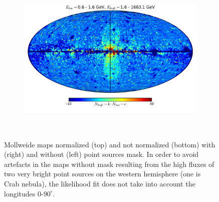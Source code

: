 \documentclass[a4paper]{article}
\begin{document}
\begin{figure}[h!]
{\begin{subfigure}[b]{.5\textwidth}
	\end{subfigure}%
	\begin{subfigure}[b]{.5\textwidth}
		\centering
		\includegraphics[width=.95\textwidth]{FitE_mollweide_at_0-1_to_1-1663_nonorm_fillmask.pdf}
	\end{subfigure}%
	}\\
\caption{Mollweide maps normalized (top) and not normalized (bottom) with (right) and without (left) point sources mask. In order to avoid artefacts in the maps without mask resulting from the high fluxes of two very bright point sources on the western hemisphere (one is Crab nebula), the likelihood fit does not take into account the longitudes 0-$90^\circ$.}
\label{Fit_IC_pi0_to_ROI}
\end{figure}
\end{document}
